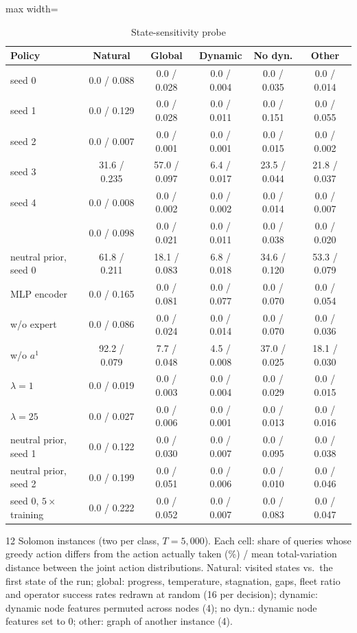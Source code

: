 \begin{table}[t]
\centering
\caption{State-sensitivity probe}\label{tab:probe}
\setlength{\tabcolsep}{3pt}
\begin{adjustbox}{max width=\linewidth}
\begin{tabular}{lccccc}
\toprule
Policy & Natural & Global & Dynamic & No dyn. & Other\\ \midrule
\sgalns{} seed 0 & 0.0 / 0.088 & 0.0 / 0.028 & 0.0 / 0.004 & 0.0 / 0.035 & 0.0 / 0.014\\
seed 1 & 0.0 / 0.129 & 0.0 / 0.028 & 0.0 / 0.011 & 0.0 / 0.151 & 0.0 / 0.055\\
seed 2 & 0.0 / 0.007 & 0.0 / 0.001 & 0.0 / 0.001 & 0.0 / 0.015 & 0.0 / 0.002\\
seed 3 & 31.6 / 0.235 & 57.0 / 0.097 & 6.4 / 0.017 & 23.5 / 0.044 & 21.8 / 0.037\\
seed 4 & 0.0 / 0.008 & 0.0 / 0.002 & 0.0 / 0.002 & 0.0 / 0.014 & 0.0 / 0.007\\
\sgc{} & 0.0 / 0.098 & 0.0 / 0.021 & 0.0 / 0.011 & 0.0 / 0.038 & 0.0 / 0.020\\
neutral prior, seed 0 & 61.8 / 0.211 & 18.1 / 0.083 & 6.8 / 0.018 & 34.6 / 0.120 & 53.3 / 0.079\\
MLP encoder & 0.0 / 0.165 & 0.0 / 0.081 & 0.0 / 0.077 & 0.0 / 0.070 & 0.0 / 0.054\\
w/o expert & 0.0 / 0.086 & 0.0 / 0.024 & 0.0 / 0.014 & 0.0 / 0.070 & 0.0 / 0.036\\
w/o $a^1$ & 92.2 / 0.079 & 7.7 / 0.048 & 4.5 / 0.008 & 37.0 / 0.025 & 18.1 / 0.030\\
$\lambda=1$ & 0.0 / 0.019 & 0.0 / 0.003 & 0.0 / 0.004 & 0.0 / 0.029 & 0.0 / 0.015\\
$\lambda=25$ & 0.0 / 0.027 & 0.0 / 0.006 & 0.0 / 0.001 & 0.0 / 0.013 & 0.0 / 0.016\\
neutral prior, seed 1 & 0.0 / 0.122 & 0.0 / 0.030 & 0.0 / 0.007 & 0.0 / 0.095 & 0.0 / 0.038\\
neutral prior, seed 2 & 0.0 / 0.199 & 0.0 / 0.051 & 0.0 / 0.006 & 0.0 / 0.010 & 0.0 / 0.046\\
seed 0, $5\times$ training & 0.0 / 0.222 & 0.0 / 0.052 & 0.0 / 0.007 & 0.0 / 0.083 & 0.0 / 0.047\\
\bottomrule
\end{tabular}
\end{adjustbox}
\par\vspace{2pt}\parbox{\linewidth}{\footnotesize 12 Solomon instances (two per class, $T=5{,}000$). Each cell: share of queries whose greedy action differs from the action actually taken (\%) / mean total-variation distance between the joint action distributions. Natural: visited states vs.\ the first state of the run; global: progress, temperature, stagnation, gaps, fleet ratio and operator success rates redrawn at random (16 per decision); dynamic: dynamic node features permuted across nodes (4); no dyn.: dynamic node features set to 0; other: graph of another instance (4).}
\end{table}
